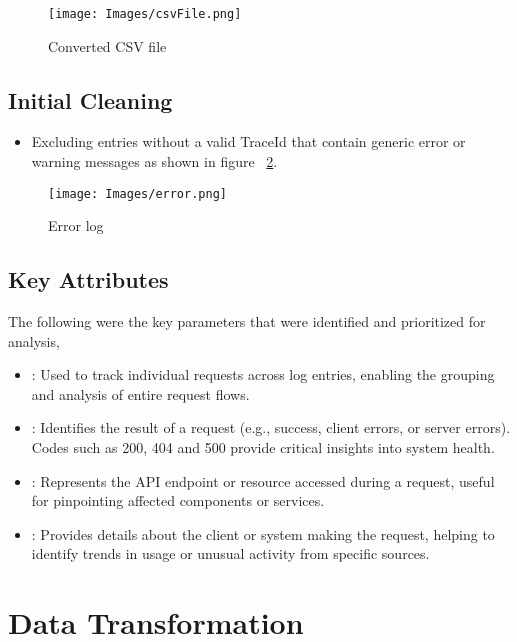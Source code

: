 \begin{figure}
	\begin{center}
		\texttt{[image: Images/csvFile.png]}
		\caption{Converted CSV file}
		\label{csvFile} 
	\end{center}
\end{figure}

\subsection{Initial Cleaning}
\begin{itemize} 
	\item Excluding entries without a valid TraceId that contain generic error or warning messages as shown in figure ~\ref{error}.
\end{itemize}
\begin{figure}
	\begin{center}
		\texttt{[image: Images/error.png]}
		\caption{Error log}
		\label{error} 
	\end{center}
\end{figure}

\subsection{Key Attributes}
The following were the key parameters that were identified and prioritized for analysis,
\begin{itemize}
	\item {}: Used to track individual requests across log entries, enabling the grouping and analysis of entire request flows.
	\item {}: Identifies the result of a request (e.g., success, client errors, or server errors). Codes such as 200, 404 and 500 provide critical insights into system health.
	\item {}: Represents the API endpoint or resource accessed during a request, useful for pinpointing affected components or services.
	\item {}: Provides details about the client or system making the request, helping to identify trends in usage or unusual activity from specific sources.
\end{itemize}

\section{Data Transformation}

